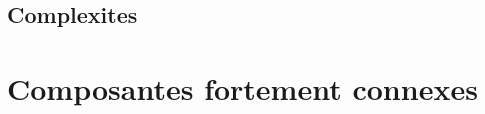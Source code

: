 \subsection{Complexites}\label{grd_complexites}
	

\section{Composantes fortement connexes}\label{grd_scc}


